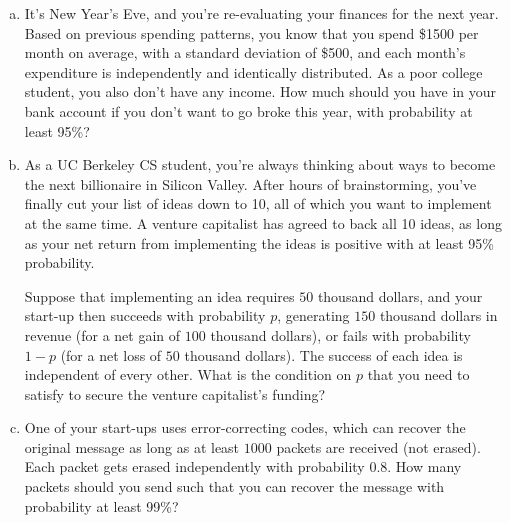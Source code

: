\begin{enumerate}[(a)]
	\item It's New Year's Eve, and you're re-evaluating your finances for the next year. Based on previous spending patterns, you know that you spend \$1500 per month on average, with a standard deviation of \$500, and each month's expenditure is independently and identically distributed. As a poor college student, you also don't have any income. How much should you have in your bank account if you don't want to go broke this year, with probability at least 95\%?
	
	\item As a UC Berkeley CS student, you're always thinking about ways to become the next billionaire in Silicon Valley. After hours of brainstorming, you've finally cut your list of ideas down to 10, all of which you want to implement at the same time. A venture capitalist has agreed to back all 10 ideas, as long as your net return from implementing the ideas is positive with at least 95\% probability.
	
	Suppose that implementing an idea requires $50$ thousand dollars, and your start-up then succeeds with probability $p$, generating $150$ thousand dollars in revenue (for a net gain of $100$ thousand dollars), or fails with probability $1 - p$ (for a net loss of $50$ thousand dollars). The success of each idea is independent of every other. What is the condition on $p$ that you need to satisfy to secure the venture capitalist's funding?

    \item One of your start-ups uses error-correcting codes, which can recover the original message as long as at least $1000$ packets are received (not erased). Each packet gets erased independently with probability $0.8$. How many packets should you send such that you can recover the message with probability at least 99\%?
\end{enumerate}


